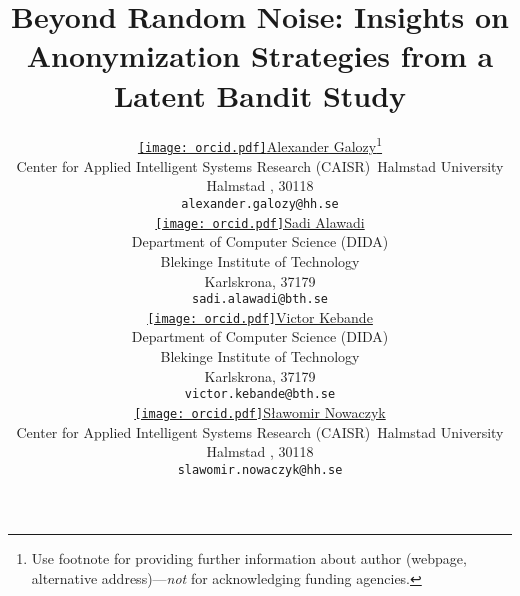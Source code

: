 \documentclass{article}
\title{Beyond Random Noise: Insights on Anonymization Strategies from a Latent Bandit Study}
\author{ \href{https://orcid.org/0000-0002-7453-9186}{\texttt{[image: orcid.pdf]}\hspace{1mm}Alexander Galozy}\thanks{Use footnote for providing further
		information about author (webpage, alternative
		address)---\emph{not} for acknowledging funding agencies.} \\
	Center for Applied Intelligent Systems Research (CAISR)\
	Halmstad University\\
	Halmstad , 30118\\
	\texttt{alexander.galozy@hh.se} \\
	\And
	\href{https://orcid.org/0000-0002-5380-4358}{\texttt{[image: orcid.pdf]}\hspace{1mm}Sadi Alawadi} \\
	Department of Computer Science (DIDA)\\
	Blekinge Institute of Technology\\
	Karlskrona, 37179 \\
	\texttt{sadi.alawadi@bth.se} \\
    \And
	\href{https://orcid.org/0000-0003-4071-4596}{\texttt{[image: orcid.pdf]}\hspace{1mm}Victor Kebande} \\
	Department of Computer Science (DIDA)\\
	Blekinge Institute of Technology\\
	Karlskrona, 37179 \\
	\texttt{victor.kebande@bth.se} \\
     \And
     \href{https://orcid.org/0000-0002-7796-5201}{\texttt{[image: orcid.pdf]}\hspace{1mm}S\l{}awomir Nowaczyk} \\
      Center for Applied Intelligent Systems Research (CAISR)\
	   Halmstad University\\
	   Halmstad , 30118\\
    	\texttt{slawomir.nowaczyk@hh.se} \\
}
\begin{document}
\maketitle


\begin{abstract}



\end{abstract}
\end{document}
